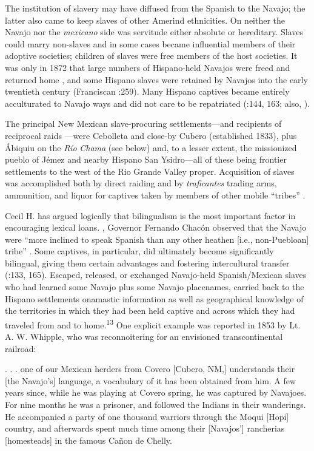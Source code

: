 The institution of slavery may have diffused from the Spanish to the Navajo; the latter also came to keep slaves of other Amerind ethnicities.  On neither the Navajo nor the \textit{mexicano} side was servitude either absolute or hereditary.  Slaves could marry non-slaves and in some cases became influential members of their adoptive societies; children of slaves were free members of the host societies.  It was only in 1872 that large numbers of Hispano-held Navajos were freed and returned home \citep[100]{Moore1994}, and some Hispano slaves were retained by Navajos into the early twentieth century (Franciscan \citealt{Fathers1910}:259).  Many Hispano captives became entirely acculturated to Navajo ways and did not care to be repatriated (\citealt{Brugge1985}:144, 163; also, \citealt{Swadesh1979}).

The principal New Mexican slave-procuring settlements—and recipients of reciprocal raids \citep[23]{Bailey1964b}—were Cebolleta and close-by Cubero (established 1833), plus Ábiquiu on the \textit{Río} \textit{Chama} (see below) and, to a lesser extent, the missionized pueblo of Jémez and nearby Hispano San Ysidro—all of these being frontier settlements to the west of the Rio Grande Valley proper.  Acquisition of slaves was accomplished both by direct raiding and by \textit{traficantes} trading arms, ammunition, and liquor for captives taken by members of other mobile “tribes” \citep{Brooks2002}.

Cecil H. \citet{Brown1994} has argued logically that bilingualism is the most important factor in encouraging lexical loans.  \citealt{In1795}, Governor Fernando Chacón observed that the Navajo were “more inclined to speak Spanish than any other heathen [i.e., non-Puebloan] tribe” \citep[104]{Reeve1971a}.  Some captives, in particular, did ultimately become significantly bilingual, giving them certain advantages and fostering intercultural transfer (\citealt{Brugge1985}:133, 165).  Escaped, released, or exchanged Navajo-held Spanish/Mexican slaves who had learned some Navajo plus some Navajo placenames, carried back to the Hispano settlements onamastic information as well as geographical knowledge of the territories in which they had been held captive and across which they had traveled from and to home.\textsuperscript{13}  One explicit example was reported in 1853 by Lt. A. W. Whipple, who was reconnoitering for an envisioned transcontinental railroad:

. . . one of our Mexican herders from Covero [Cubero, NM,] understands their [the Navajo’s] language, a vocabulary of it has been obtained from him.  A few years since, while he was playing at Covero spring, he was captured by Navajoes.  For nine months he was a prisoner, and followed the Indians in their wanderings.  He accompanied a party of one thousand warriors through the Moqui [Hopi] country, and afterwards spent much time among their [Navajos’] rancherias [homesteads] in the famous Cañon de Chelly.  \citep[158]{Foreman1941}

